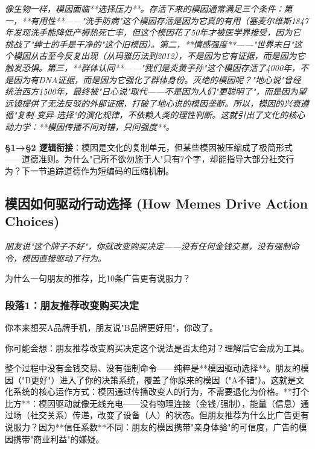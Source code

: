 \documentclass[a4paper,12pt]{book}
\newenvironment{motivation}{\begin{tcolorbox}[colback=gray!10,colframe=gray!60,title=\textit{动机}]\small\itshape}{\end{tcolorbox}}
\newenvironment{questionbox}{\begin{tcolorbox}[colback=red!3,colframe=red!60]}{\end{tcolorbox}}
\begin{document}
\begin{motivation}
\begin{motivation}
\begin{motivation}
像生物一样，模因面临**选择压力**。存活下来的模因通常满足三个条件：第一，**有用性**——"洗手防病"这个模因存活是因为它真的有用（塞麦尔维斯1847年发现洗手能降低产褥热死亡率，但这个模因花了50年才被医学界接受，因为它挑战了"绅士的手是干净的"这个旧模因）。第二，**情感强度**——"世界末日"这个模因从古至今反复出现（从玛雅历法到2012），不是因为它有证据，而是因为它触发恐惧。第三，**群体认同**——"我们是炎黄子孙"这个模因存活了4000年，不是因为有DNA证据，而是因为它强化了群体身份。灭绝的模因呢？"地心说"曾经统治西方1500年，最终被"日心说"取代——不是因为人们"更聪明了"，而是因为望远镜提供了无法反驳的外部证据，打破了地心说的模因垄断。所以，模因的兴衰遵循"复制-变异-选择"的演化规律，不依赖人类的理性判断。这就引出了文化的核心动力学：**模因传播不问对错，只问强度**。

	\textbf{§1→§2 逻辑衔接}：模因是文化的复制单元，但某些模因被压缩成了极简形式——道德准则。为什么"己所不欲勿施于人"只有7个字，却能指导大部分社交行为？下一节追踪道德作为短编码的压缩机制。

	
	\subsection{模因如何驱动行动选择 (How Memes Drive Action Choices)}
	\begin{motivation}
		朋友说"这个牌子不好"，你就改变购买决定——没有任何金钱交易，没有强制命令，模因直接驱动了行为。
	\end{motivation}
	\begin{questionbox}
		为什么一句朋友的推荐，比10条广告更有说服力？
	\end{questionbox}

	\subsubsection*{段落1：朋友推荐改变购买决定}
	你本来想买A品牌手机，朋友说"B品牌更好用"，你改了。
	\begin{tcolorbox}[colback=yellow!5, title=\textit{读者行为预测}]
		你可能会想：朋友推荐改变购买决定这个说法是否太绝对？理解后它会成为工具。
	\end{tcolorbox}

整个过程中没有金钱交易、没有强制命令——纯粹是**模因驱动选择**。朋友的模因（"B更好"）进入了你的决策系统，覆盖了你原来的模因（"A不错"）。这就是文化系统的核心运作方式：模因通过传播改变人的行为，不需要退化为价格。**打个比方**：模因驱动就像无线充电——没有物理连接（金钱/强制），能量（信息）通过场（社交关系）传递，改变了设备（人）的状态。但朋友推荐为什么比广告更有说服力？因为**信任系数**不同：朋友的模因携带"亲身体验"的可信度，广告的模因携带"商业利益"的嫌疑。


\end{motivation}
\end{motivation}
\end{motivation}
\end{document}
